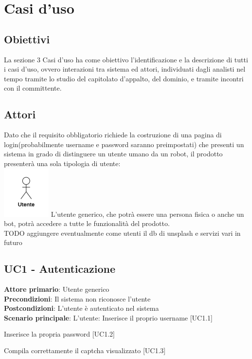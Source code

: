 \section{Casi d'uso}

\subsection{Obiettivi}
La sezione 3 Casi d’uso ha come obiettivo l'identificazione e la descrizione di tutti i casi d'uso, ovvero interazioni tra sistema ed attori, individuati dagli analisti nel tempo tramite lo studio del capitolato d’appalto, del dominio, e tramite incontri con il committente.

\subsection{Attori}
Dato che il requisito obbligatorio richiede la costruzione di una pagina di login(probabilmente username e password saranno preimpostati) che presenti un sistema in grado di distinguere un utente umano da un robot, il prodotto presenterà una sola tipologia di utente:\\
\includegraphics[scale = 1]{img/attori1.png}
L’utente generico, che potrà essere una persona fisica o anche un bot, potrà accedere a tutte le funzionalità del prodotto. \\
TODO aggiungere eventualmente come utenti il db di unsplash e servizi vari in futuro

\subsection{UC1 - Autenticazione}
\textbf{Attore primario}: Utente generico\\
\textbf{Precondizioni}: Il sistema non riconosce l’utente\\
\textbf{Postcondizioni}: L’utente è autenticato nel sistema\\

\textbf{Scenario principale}: L’utente:
	Inserisce il proprio username [UC1.1]

	Inserisce la propria password [UC1.2]

	Compila correttamente il captcha visualizzato [UC1.3]

